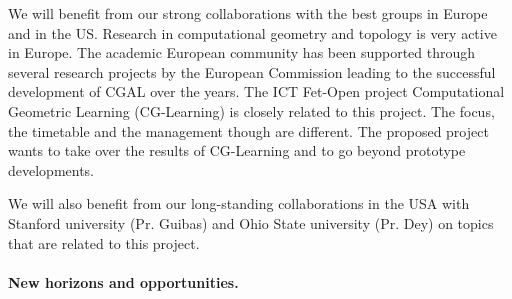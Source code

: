 We will benefit from our strong collaborations with the best groups in Europe and in the US.
Research in computational geometry and topology is very active in  Europe.  The academic European community has been supported through several research projects by the European Commission leading to the successful development of CGAL over the years.  The ICT Fet-Open project Computational Geometric Learning (CG-Learning) is closely related to this project. The focus, the timetable and the management though are different. The proposed project wants to take over the results of CG-Learning and to go beyond prototype developments.  %

We will also benefit from our long-standing collaborations in the USA with Stanford university (Pr. Guibas) and Ohio State university (Pr. Dey) on topics that are related to this project.



\paragraph{New horizons and opportunities.} 




